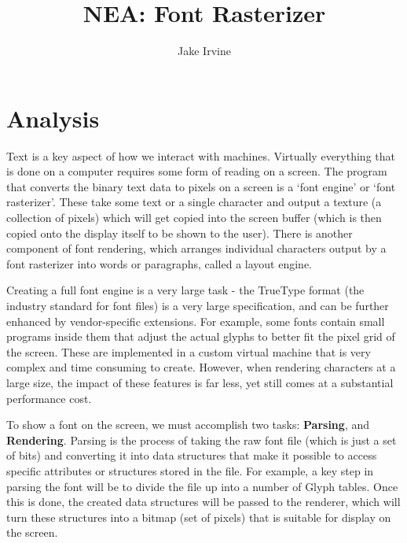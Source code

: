 \documentclass{report}
\begin{document}
\title{NEA: Font Rasterizer}
\author{Jake Irvine}


%

\maketitle
\chapter{Analysis}

Text is a key aspect of how we interact with machines. Virtually everything that
is done on a computer requires some form of reading on a screen. The program
that converts the binary text data to pixels on a screen is a `font engine' or
`font rasterizer'. These take some text or a single character and output a
texture (a collection of pixels) which will get copied into the screen buffer
(which is then copied onto the display itself to be shown to the user). There is
another component of font rendering, which arranges individual characters output
by a font rasterizer into words or paragraphs, called a layout engine.

Creating a full font engine is a very large task - the TrueType format (the
industry standard for font files) is a very large specification, and can be
further enhanced by vendor-specific extensions. For example, some fonts contain
small programs inside them that adjust the actual glyphs to better fit the pixel
grid of the screen. These are implemented in a custom virtual machine that is
very complex and time consuming to create. However, when rendering characters at
a large size, the impact of these features is far less, yet still comes at a
substantial performance cost.

To show a font on the screen, we must accomplish two tasks: \textbf{Parsing},
and \textbf{Rendering}. Parsing is the process of taking the raw font file
(which is just a set of bits) and converting it into data structures that make
it possible to access specific attributes or structures stored in the file. For
example, a key step in parsing the font will be to divide the file up into a
number of Glyph tables. Once this is done, the created data structures will be
passed to the renderer, which will turn these structures into a bitmap (set of
pixels) that is suitable for display on the screen.
\end{document}
